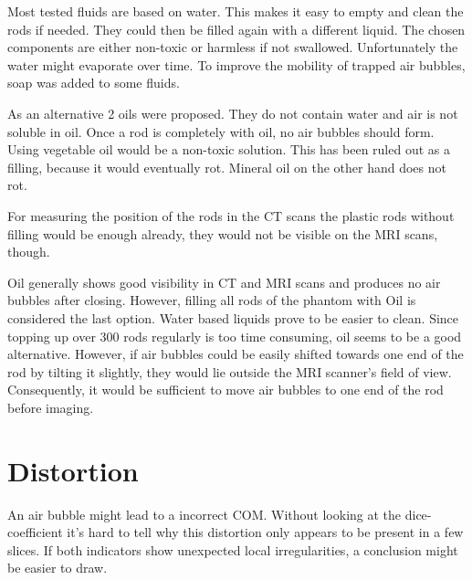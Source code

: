 Most tested fluids are based on water. This makes it easy to empty and clean the rods if needed. They could then be filled again with a different liquid.
The chosen components are either non-toxic or harmless if not swallowed.
Unfortunately the water might evaporate over time. To improve the mobility of trapped air bubbles, soap was added to some fluids.

As an alternative 2 oils were proposed. They do not contain water and air is not soluble in oil. Once a rod is completely with oil, no air bubbles should form.
Using vegetable oil would be a non-toxic solution. This has been ruled out as a filling, because it would eventually rot.
Mineral oil on the other hand does not rot.


For measuring the position of the rods in the CT scans the plastic rods without filling would be enough already, they would not be visible on the MRI scans, though.

Oil generally shows good visibility in CT and MRI scans and produces no air bubbles after closing.
However, filling all rods of the phantom with Oil is considered the last option. Water based liquids prove to be easier to clean.
Since topping up over 300 rods regularly is too time consuming, oil seems to be a good alternative.
However, if air bubbles could be easily shifted towards one end of the rod by tilting it slightly, they would lie outside the MRI scanner's field of view.
Consequently, it would be sufficient to move air bubbles to one end of the rod before imaging.



\section{Distortion}
An air bubble might lead to a incorrect COM. Without looking at the dice-coefficient it's hard to tell why this distortion only appears to be present in a few slices.
If both indicators show unexpected local irregularities, a conclusion might be easier to draw.

